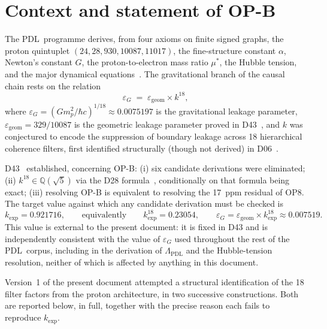 \documentclass[12pt,a4paper]{article}
\theoremstyle{plain}
\theoremstyle{definition}
\theoremstyle{remark}
\newcommand{\PDL}{\textsc{PDL}}
\newcommand{\egeom}{\varepsilon_{\mathrm{geom}}}
\newcommand{\eG}{\varepsilon_G}
\begin{document}
\begin{titlepage}
\begin{center}
\begin{abstract}
\end{abstract}
\end{center}
\end{titlepage}

\tableofcontents
\newpage

\section{Context and statement of OP-B}
\label{sec:context}

The \PDL\ programme derives, from four axioms on finite signed graphs, the proton quintuplet $(24,28,930,10087,11017)$, the fine-structure constant $\alpha$, Newton's constant $G$, the proton-to-electron mass ratio $\mu^*$, the Hubble tension, and the major dynamical equations~\citep{D43}. The gravitational branch of the causal chain rests on the relation
\[
\eG \;=\; \egeom \times k^{18},
\]
where $\eG=(Gm_p^2/\hbar c)^{1/18}\approx0.0075197$ is the gravitational leakage parameter, $\egeom=329/10087$ is the geometric leakage parameter proved in D43~\citep{D43}, and $k$ was conjectured to encode the suppression of boundary leakage across 18 hierarchical coherence filters, first identified structurally (though not derived) in D06~\citep{D06}.

D43~\citep{D43} established, concerning OP-B: (i) six candidate derivations were eliminated; (ii) $k^{18}\in\mathbb{Q}(\sqrt5)$ via the D28 formula~\citep{D28}, conditionally on that formula being exact; (iii) resolving OP-B is equivalent to resolving the 17~ppm residual of OP8. The target value against which any candidate derivation must be checked is
\[
k_{\exp} = 0.921716, \qquad\text{equivalently}\qquad k_{\exp}^{18} = 0.23054, \qquad \eG = \egeom\times k_{\exp}^{18}\approx0.007519.
\]
This value is external to the present document: it is fixed in D43 and is independently consistent with the value of $\eG$ used throughout the rest of the \PDL\ corpus, including in the derivation of $\Lambda_{\mathrm{PDL}}$ and the Hubble-tension resolution, neither of which is affected by anything in this document.

Version~1 of the present document attempted a structural identification of the 18 filter factors from the proton architecture, in two successive constructions. Both are reported below, in full, together with the precise reason each fails to reproduce $k_{\exp}$.
\end{document}
